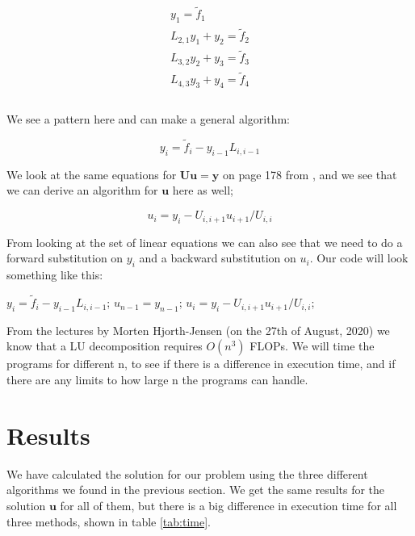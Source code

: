 \documentclass[oneside, final, 11pt, english, twocolumn]{article}
\begin{document}
\begin{align*}
y_1 = \tilde{f}_1 \\
L_{2,1}y_1 + y_2 = \tilde{f}_2 \\
L_{3,2}y_2 + y_3 = \tilde{f}_3\\
L_{4,3}y_3 + y_4 = \tilde{f}_4 \\
 \\
\end{align*}

We see a pattern here and can make a general algorithm: 

\begin{equation}
y_i = \tilde{f}_i - y_{i-1} L_{i,i-1}
\end{equation}

We look at the same equations for $\mathbf{U}\mathbf{u} = \mathbf{y}$ on page 178 from \cite{stat}, and we see that we can derive an algorithm for $\mathbf{u}$ here as well; 

\begin{equation}
u_i = y_i -  U_{i,i+1} u_{i+1} / U_{i,i}
\end{equation}

From looking at the set of linear equations we can also see that we need to do a forward substitution on $y_i$ and a backward substitution on $u_i$. Our code will look something like this: 


\begin{algorithmic}[H]
\State
{}
	\State $y_i = \tilde{f}_i - y_{i-1} L_{i,i-1}$;
\EndFor
\State
\State $u_{n-1} = y_{n-1}$;
\State
{}
	\State $u_i = y_i -  U_{i,i+1} u_{i+1} / U_{i,i}$;
\EndFor
\State
\end{algorithmic}

From the lectures by Morten Hjorth-Jensen (on the 27th of August, 2020) we know that a LU decomposition requires $O(n^3)$ FLOPs. We will time the programs for different n, to see if there is a difference in execution time, and if there are any limits to how large n the programs can handle. 


\section{Results}

We have calculated the solution for our problem using the three different algorithms we found in the previous section. We get the same results for the solution $\mathbf{u}$ for all of them, but there is a big difference in execution time for all three methods, shown in table \ref{tab:time}. 
\end{document}

